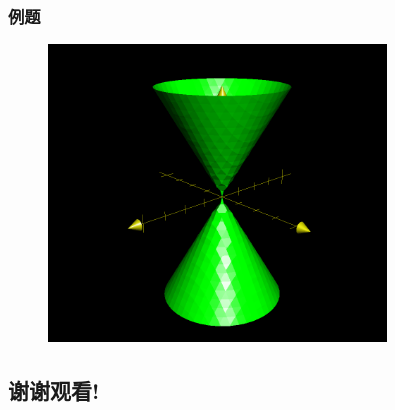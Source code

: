 \documentclass[xetex]{beamer}
\begin{document}
\begin{frame}
    \frametitle{例题}
    \begin{figure}[ht]
        \centering %
       \includegraphics[width=0.8\textwidth]{img/d.jpg}
    \end{figure}
\end{frame}

\begin{frame}
    \section{谢谢观看!}
\end{frame}
\end{document}
